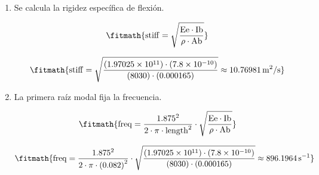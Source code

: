 \begin{enumerate}

\item Se calcula la rigidez específica de flexión.

\[\fitmath{\mathrm{stiff}=\sqrt{\frac{\mathrm{Ee}\cdot \mathrm{Ib}}{\rho\cdot \mathrm{Ab}}}}\]

\[\fitmath{\mathrm{stiff}=\sqrt{\frac{(1.97025\times10^{11})\cdot (7.8\times10^{-10})}{(8030)\cdot (0.000165)}}\approx 10.76981\,\mathrm{m^{2}/s}}\]

\item La primera raíz modal fija la frecuencia.

\[\fitmath{\mathrm{freq}=\frac{{1.875}^{2}}{2\cdot \pi\cdot {\mathrm{length}}^{2}}\cdot \sqrt{\frac{\mathrm{Ee}\cdot \mathrm{Ib}}{\rho\cdot \mathrm{Ab}}}}\]

\[\fitmath{\mathrm{freq}=\frac{{1.875}^{2}}{2\cdot \pi\cdot {(0.082)}^{2}}\cdot \sqrt{\frac{(1.97025\times10^{11})\cdot (7.8\times10^{-10})}{(8030)\cdot (0.000165)}}\approx 896.1964\,\mathrm{s^{-1}}}\]

\end{enumerate}

